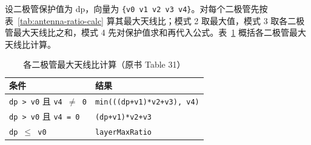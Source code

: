 设二极管保护值为 dp，向量为 \texttt{\{v0 v1 v2 v3 v4\}}。对每个二极管先按表~\ref{tab:antenna-ratio-calc} 算其最大天线比；模式 2 取最大值，模式 3 取各二极管最大天线比之和，模式 4 先对保护值求和再代入公式。表~\ref{tab:max-ratio-per-diode} 概括各二极管最大天线比计算。

\begin{table}[htbp]
\centering
\caption{各二极管最大天线比计算（原书 Table 31）}
\label{tab:max-ratio-per-diode}
\begin{tabular}{@{}lp{}@{}}
\toprule
条件 & 结果 \\
\midrule
\texttt{dp > v0} 且 \texttt{v4 $\neq$ 0} & \texttt{min(((dp+v1)*v2+v3), v4)} \\
\texttt{dp > v0} 且 \texttt{v4 = 0} & \texttt{(dp+v1)*v2+v3} \\
\texttt{dp $\leq$ v0} & \texttt{layerMaxRatio} \\
\bottomrule
\end{tabular}
\end{table}
